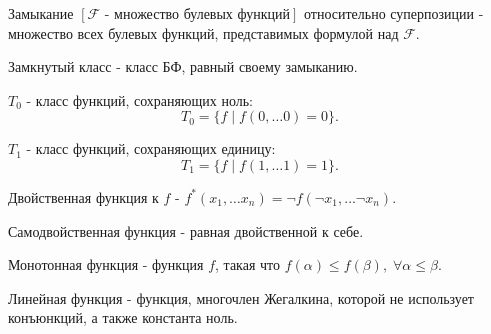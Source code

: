 \documentclass[12pt]{article}
\begin{document}
\begin{defn}
    Замыкание $[\mathcal{F} \mbox{ - множество булевых функций}]$ относительно суперпозиции - множество всех булевых функций, представимых формулой над $\mathcal{F}$.
\end{defn}
\begin{defn}
    Замкнутый класс - класс БФ, равный своему замыканию.
\end{defn}
\begin{defn}
    $T_0$ - класс функций, сохраняющих ноль:  \[
	T_0 = \{f \mid f(0, \ldots 0) = 0\}
    .\] 
\end{defn}
\begin{defn}
    $T_1$ - класс функций, сохраняющих единицу: \[
	T_1 = \{ f \mid f(1, \ldots 1) = 1\}
    .\] 
\end{defn}
\begin{defn}
    Двойственная функция к $f$ - $f^*(x_1, \ldots x_n) = \neg f(\neg x_1, \ldots \neg x_n)$.
\end{defn}
\begin{defn}
    Самодвойственная функция - равная двойственной к себе.
\end{defn}
\begin{defn}
    Монотонная функция - функция $f$,  такая что $f(\alpha ) \le f(\beta), \; \forall \alpha \le \beta$.
\end{defn}
\begin{defn}
    Линейная функция - функция, многочлен Жегалкина, которой не использует конъюнкций, а также константа ноль.
\end{defn}
\end{document}
